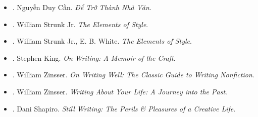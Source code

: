 \documentclass[12pt,twoside]{book}
\begin{document}
\begin{itemize}
	\item \cite{Can_nha_van}. Nguyễn Duy Cần. {\it Để Trở Thành Nhà Văn}.
	\item \cite{Strunk_element_style}. William Strunk Jr. {\it The Elements of Style}.
	\item \cite{Strunk_White_element_style}. William Strunk Jr., E. B. White. {\it The Elements of Style}.
	\item \cite{King2000,King2010}. Stephen King. {\it On Writing: A Memoir of the Craft}.
	\item \cite{Zinsser2001,Zinsser2016}. William Zinsser. {\it On Writing Well: The Classic Guide to Writing Nonfiction}.
	\item \cite{Zinsser2005}. William Zinsser. {\it Writing About Your Life: A Journey into the Past}.
	\item \cite{Shapiro2014}. Dani Shapiro. {\it Still Writing: The Perils \& Pleasures of a Creative Life}.
\end{itemize}
\end{document}
